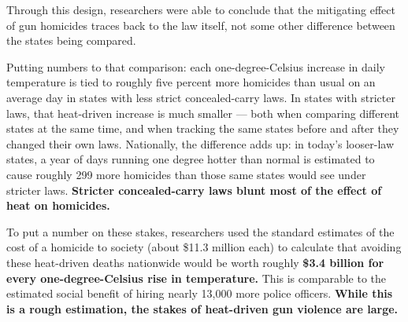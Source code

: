 \documentclass[
  11pt,
]{article}
\newcommand{\sectionhead}[1]{%
  \vspace{2pt}{\color{ink}\bfseries\fontsize{9.75pt}{12pt}\selectfont
  \textls[20]{\MakeUppercase{#1}}\par}\vspace{1pt}}
\begin{document}
\vspace{6pt}


\sectionhead{Findings}



\vspace{6pt}

\noindent Through this design, researchers were able to conclude that the mitigating effect of gun homicides traces back to the law itself, not some other difference between the states being compared.

\noindent Putting numbers to that comparison: each one-degree-Celsius increase in daily temperature is tied to roughly five percent more homicides than usual on an average day in states with less strict concealed-carry laws. In states with stricter laws, that heat-driven increase is much smaller --- both when comparing different states at the same time, and when tracking the same states before and after they changed their own laws. Nationally, the difference adds up: in today's looser-law states, a year of days running one degree hotter than normal is estimated to cause roughly 299 more homicides than those same states would see under stricter laws. \textbf{Stricter concealed-carry laws blunt most of the effect of heat on homicides.}

\noindent To put a number on these stakes, researchers used the standard estimates of the cost of a homicide to society (about \$11.3 million each) to calculate that avoiding these heat-driven deaths nationwide would be worth roughly \textbf{\$3.4 billion for every one-degree-Celsius rise in temperature.} This is comparable to the estimated social benefit of hiring nearly 13,000 more police officers. \textbf{While this is a rough estimation, the stakes of heat-driven gun violence are large.}

\end{document}
